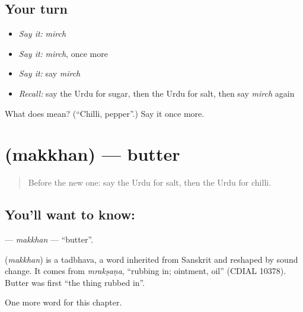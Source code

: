 \subsection*{Your turn}
\begin{itemize}
\raggedright
  \item \emph{Say it:} \emph{mirch}
  \item \emph{Say it:} \emph{mirch}, once more
  \item \emph{Say it:} say \emph{mirch}
  \item \emph{Recall:} say the Urdu for sugar, then the Urdu for salt, then say \emph{mirch} again
\end{itemize}

\begin{tcolorbox}[breakable,colback=teal!4,colframe=teal!35!black,title={Before you move on}]
What does  mean? (\textquotedblleft{}Chilli, pepper\textquotedblright{}.) Say it once more.
\end{tcolorbox}
\section[\texorpdfstring{\ur{مکھن} (makkhan)}{مکھن (makkhan)}]{ (makkhan) — butter}

\label{lesson:UR-C56-makkhan}



\begin{quote}
Before the new one: say the Urdu for salt, then the Urdu for chilli.
\end{quote}

\subsection*{You'll want to know: }
\textbf{} — \emph{makkhan} — \textquotedblleft{}butter\textquotedblright{}.

\begin{cousinweb}
\textbf{} (\emph{makkhan}) is a tadbhava, a word inherited from Sanskrit and reshaped by sound change. It comes from \emph{mrakṣaṇa}, \textquotedblleft{}rubbing in; ointment, oil\textquotedblright{} (CDIAL 10378). Butter was first \textquotedblleft{}the thing rubbed in\textquotedblright{}.
\end{cousinweb}

\begin{grammarlens}[title={What you've built}]
One more word for this chapter.
\end{grammarlens}

